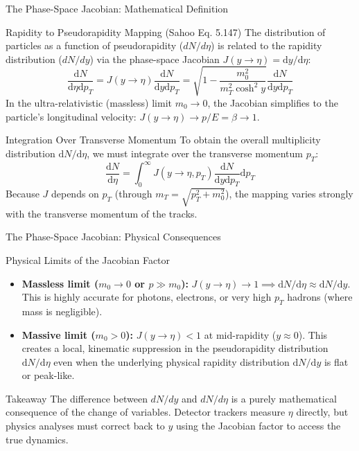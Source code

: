 \documentclass[aspectratio=169]{beamer}
\begin{document}
\begin{frame}{The Phase-Space Jacobian: Mathematical Definition}
    \begin{block}{Rapidity to Pseudorapidity Mapping (Sahoo Eq. 5.147)}
        \footnotesize
        The distribution of particles as a function of pseudorapidity ($dN/d\eta$) is related to the rapidity distribution ($dN/dy$) via the phase-space Jacobian $J(y \to \eta) = \mathrm{d}y/\mathrm{d}\eta$:
        \[ \frac{\mathrm{d}N}{\mathrm{d}\eta \mathrm{d}p_T} = J(y \to \eta) \frac{\mathrm{d}N}{\mathrm{d}y \mathrm{d}p_T} = \sqrt{1 - \frac{m_0^2}{m_T^2 \cosh^2 y}} \frac{\mathrm{d}N}{\mathrm{d}y \mathrm{d}p_T} \]
        In the ultra-relativistic (massless) limit $m_0 \to 0$, the Jacobian simplifies to the particle's longitudinal velocity: $J(y \to \eta) \to p/E = \beta \to 1$.
    \end{block}
    \begin{block}{Integration Over Transverse Momentum}
        \footnotesize
        To obtain the overall multiplicity distribution $\mathrm{d}N/\mathrm{d}\eta$, we must integrate over the transverse momentum $p_T$:
        \[ \textstyle \frac{\mathrm{d}N}{\mathrm{d}\eta} = \int_{0}^{\infty} J(y \to \eta, p_T) \frac{\mathrm{d}N}{\mathrm{d}y \mathrm{d}p_T} \mathrm{d}p_T \]
        Because $J$ depends on $p_T$ (through $m_T = \sqrt{p_T^2 + m_0^2}$), the mapping varies strongly with the transverse momentum of the tracks.
    \end{block}
\end{frame}

\begin{frame}{The Phase-Space Jacobian: Physical Consequences}
    \begin{block}{Physical Limits of the Jacobian Factor}
        \footnotesize
        \begin{itemize}
            \item \textbf{Massless limit ($m_0 \to 0$ or $p \gg m_0$):} $J(y \to \eta) \to 1 \implies \mathrm{d}N/\mathrm{d}\eta \approx \mathrm{d}N/\mathrm{d}y$. This is highly accurate for photons, electrons, or very high $p_T$ hadrons (where mass is negligible).
            \item \textbf{Massive limit ($m_0 > 0$):} $J(y \to \eta) < 1$ at mid-rapidity ($y \approx 0$). This creates a local, kinematic suppression in the pseudorapidity distribution $\mathrm{d}N/\mathrm{d}\eta$ even when the underlying physical rapidity distribution $\mathrm{d}N/\mathrm{d}y$ is flat or peak-like.
        \end{itemize}
    \end{block}
    \begin{alertblock}{Takeaway}
        The difference between $dN/dy$ and $dN/d\eta$ is a purely mathematical consequence of the change of variables. Detector trackers measure $\eta$ directly, but physics analyses must correct back to $y$ using the Jacobian factor to access the true dynamics.
    \end{alertblock}
\end{frame}
\end{document}
